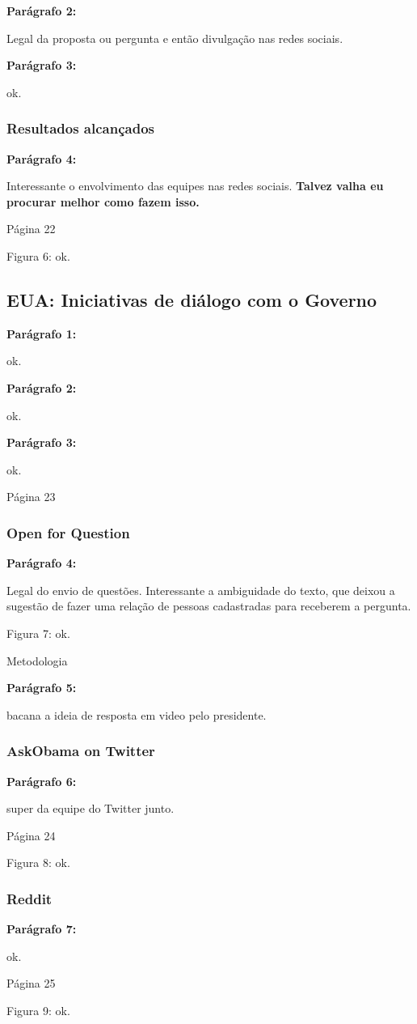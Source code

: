 \documentclass[12pt]{report}
\newcommand{\pp}[1]{

\textbf{Parágrafo #1:}

}
\begin{document}
\pp{2} Legal da proposta ou pergunta e então divulgação nas redes sociais.

\pp{3} ok.

\subsubsection{Resultados alcançados}

\pp{4} Interessante o envolvimento das equipes nas redes sociais. {\bf \color{red} Talvez valha eu procurar melhor como fazem isso.}

\noindent Página 22

Figura 6: ok.

\subsection{EUA: Iniciativas de diálogo com o Governo}

\pp{1} ok.

\pp{2} ok.

\pp{3} ok.

\noindent Página 23

\subsubsection{Open for Question}

\pp{4} Legal do envio de questões. Interessante a ambiguidade do texto, que deixou a sugestão de fazer uma relação de pessoas cadastradas para receberem a pergunta.

Figura 7: ok.

Metodologia

\pp{5} bacana a ideia de resposta em video pelo presidente.

\subsubsection{AskObama on Twitter}

\pp{6} super da equipe do Twitter junto.

\noindent Página 24

Figura 8: ok.

\subsubsection{Reddit}

\pp{7} ok.

\noindent Página 25

Figura 9: ok.
\end{document}
